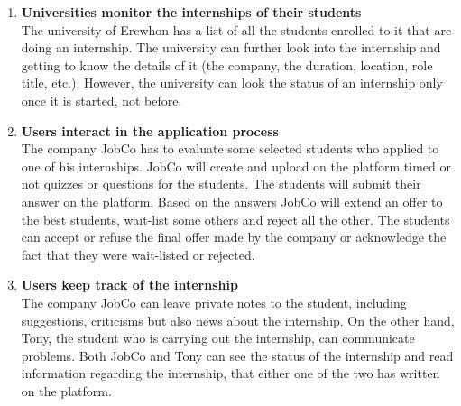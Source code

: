 \begin{enumerate}
            \item \textbf{Universities monitor the internships of their students }
            \\ The university of Erewhon has a list of all the students enrolled to it that are doing an internship. The university can further look into the internship and getting to know the details of it (the company, the duration, location, role title, etc.). However, the university can look the status of an internship only once it is started, not before.
            
            \item \textbf{Users interact in the application process}
            \\ The company JobCo has to evaluate some selected students who applied to one of his internships. JobCo will create and upload on the platform timed or not quizzes or questions for the students. The students will submit their answer on the platform. Based on the answers JobCo will extend an offer to the best students, wait-list some others and reject all the other. The students can accept or refuse the final offer made by the company or acknowledge the fact that they were wait-listed or rejected.
            
            \item \textbf{Users keep track of the internship }
            \\ The company JobCo can leave private notes to the student, including suggestions, criticisms but also news about the internship. On the other hand, Tony, the student who is carrying out the internship, can communicate problems. Both JobCo and Tony can see the status of the internship and read information regarding the internship, that either one of the two has written on the platform.

        \end{enumerate}
        
